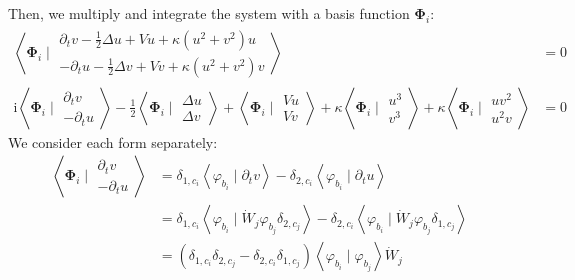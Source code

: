 \documentclass{article}
\newcommand{\bvec}[1]{\boldsymbol{#1}}
\newcommand{\ii}{\mathrm{i}}
\begin{document}
Then, we multiply and integrate the system with a basis function $\bvec{\Phi}_i$:
\begin{align*}
    \left< \bvec{\Phi}_i \mid \begin{matrix}
            \partial_t v - \frac{1}{2} \Delta u + V u + \kappa (u^2 + v^2) u \\
            -\partial_t u - \frac{1}{2} \Delta v + V v + \kappa (u^2 + v^2) v
        \end{matrix} \right> & = 0 \\
    \ii \left< \bvec{\Phi}_i \mid \begin{matrix}
            \partial_t v \\
            -\partial_t u
        \end{matrix} \right> - \frac{1}{2} \left< \bvec{\Phi}_i \mid \begin{matrix}
            \Delta u \\
            \Delta v
        \end{matrix} \right> + \left< \bvec{\Phi}_i \mid \begin{matrix}
            V u \\
            V v
        \end{matrix} \right> + \kappa \left< \bvec{\Phi}_i \mid \begin{matrix}
            u^3 \\
            v^3
        \end{matrix} \right> + \kappa \left< \bvec{\Phi}_i \mid \begin{matrix}
            u v^2 \\
            u^2 v
        \end{matrix} \right> & = 0
\end{align*}
\noindent We consider each form separately:
\begin{align*}
    \left< \bvec{\Phi}_i \mid \begin{matrix}
        \partial_t v \\
        -\partial_t u
    \end{matrix} \right>
    & = \delta_{1, c_i} \left< \varphi_{b_i} \mid \partial_t v \right>
        - \delta_{2, c_i} \left< \varphi_{b_i} \mid \partial_t u \right> \\
    & = \delta_{1, c_i} \left< \varphi_{b_i} \mid \dot{W}_j \varphi_{b_j} \delta_{2, c_j} \right>
        - \delta_{2, c_i} \left< \varphi_{b_i} \mid \dot{W}_j \varphi_{b_j} \delta_{1, c_j} \right> \\
    & = (\delta_{1, c_i} \delta_{2, c_j} - \delta_{2, c_i} \delta_{1, c_j})
        \left< \varphi_{b_i} \mid \varphi_{b_j} \right> \dot{W}_j
\end{align*}
\end{document}
